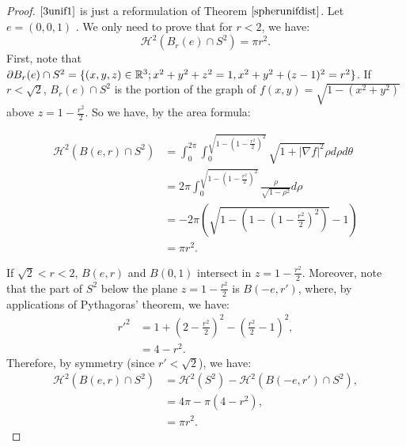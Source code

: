 \documentclass[11pt]{article}
\theoremstyle{definition}
\theoremstyle{remark}
\numberwithin{equation}{section}
\begin{document}
  \begin{proof} $\eqref{3unif1}$ is just a reformulation of Theorem $\ref{spherunifdist}$.
    Let $e=(0,0,1)$ .
    We only need to prove that for $r<2$, we have:
  $$ \mathcal{H}^{2}(B_r(e) \cap S^{2}) =\pi r^2.$$
  First, note that $\partial B_{r}(e) \cap S^{2} = \{(x,y,z) \in \mathbb{R}^3; x^2+y^2+z^2=1, x^2+y^2+(z-1)^2=r^2 \}$. If $r<\sqrt{2}$, $B_{r}(e) \cap S^{2}$ is the portion of the graph of $f(x,y)=\sqrt{1-(x^2+y^2)}$ above $z=1-\frac{r^2}{2}$. So we have, by the area formula:
  
  \begin{align*} \mathcal{H}^{2}(B(e,r) \cap S^{2}) &= \int_{0}^{2\pi} \int_{0}^{\sqrt{1-(1-\frac{r^2}{2})^2} } \sqrt{1+|\nabla{f}|^2} \rho d\rho d\theta\\
                                                                                         &= 2\pi \int_{0}^{\sqrt{1-(1-\frac{r^2}{2})^2} }  \frac{\rho}{\sqrt{1-{\rho}^2}} d\rho \\
                                                                                         &= -2 \pi \left( \sqrt{1-\left(1-\left(1-\frac{r^2}{2}\right)^2\right)}-1 \right) \\
                                                                                         &=\pi r^2. \end{align*}
                                                                                      
                                                                                      If $ \sqrt{2}<r <2$, $B(e,r)$ and $B(0,1)$ intersect in $z=1-\frac{{r}^2}{2}$.
                                                                                       Moreover, note that the part of $S^2$ below the plane $z=1-\frac{{r}^2}{2}$ is $B(-e,r')$, where, by applications of Pythagoras' theorem, we have: \begin{align*}
{r'}^2 &= 1+\left(2-\frac{{r}^2}{2}\right)^{2}- \left(\frac{r^{2}}{2}-1\right)^{2}, \\
              &=4-r^{2}.
\end{align*} 
Therefore, by symmetry (since $r' < \sqrt{2}$), we have:
\begin{align*}
\mathcal{H}^2(B(e,r) \cap {S^2}) &=\mathcal{H}^2(S^2) - \mathcal{H}^2(B(-e,r')\cap S^2), \\
&=4\pi - \pi(4-r^{2}), \\
&=\pi r^{2}. 
\end{align*}
                                                                                                                                                                             
  
  \end{proof}
  
\end{document}
